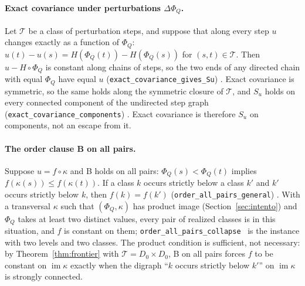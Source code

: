 \paragraph{Exact covariance under perturbations $\Delta\Phi_Q$.} Let $\mathcal T$ be a class of perturbation steps, and suppose that along every step $u$ changes exactly as a function of $\Phi_Q$: $u(t)-u(s)=H(\Phi_Q(t))-H(\Phi_Q(s))$ for $(s,t)\in\mathcal T$. Then $u-H\circ\Phi_Q$ is constant along chains of steps, so the two ends of any directed chain with equal $\Phi_Q$ have equal $u$ (\texttt{exact\_covariance\_gives\_Su}) \stL. Exact covariance is symmetric, so the same holds along the symmetric closure of $\mathcal T$, and $S_u$ holds on every connected component of the undirected step graph (\texttt{exact\_covariance\_components}) \stL. Exact covariance is therefore $S_u$ on components, not an escape from it.

\paragraph{The order clause B on all pairs.} Suppose $u=f\circ\kappa$ and B holds on all pairs: $\Phi_Q(s)<\Phi_Q(t)$ implies $f(\kappa(s))\le f(\kappa(t))$. If a class $k$ occurs strictly below a class $k'$ and $k'$ occurs strictly below $k$, then $f(k)=f(k')$ (\texttt{order\_all\_pairs\_general}) \stL. With a transversal $\kappa$ such that $(\Phi_Q,\kappa)$ has product image (Section~\ref{sec:intento}) and $\Phi_Q$ takes at least two distinct values, every pair of realized classes is in this situation, and $f$ is constant on them; \texttt{order\_all\_pairs\_collapse} \stL\ is the instance with two levels and two classes. The product condition is sufficient, not necessary: by Theorem~\ref{thm:frontier} with $\mathcal T=D_0\times D_0$, B on all pairs forces $f$ to be constant on $\operatorname{im}\kappa$ exactly when the digraph ``$k$ occurs strictly below $k'$'' on $\operatorname{im}\kappa$ is strongly connected.

